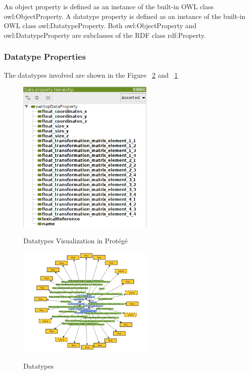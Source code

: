 An object property is defined as an instance of the built-in OWL class owl:ObjectProperty. A datatype property is defined as an instance of the built-in OWL class owl:DatatypeProperty. Both owl:ObjectProperty and owl:DatatypeProperty are subclasses of the RDF class rdf:Property.\\

\subsubsection*{Datatype Properties}
The datatypes involved are shown in the Figure ~\ref{fig:datatypes} and ~\ref{fig:datatypesProtege}

\begin{figure}[H]
\centering
\includegraphics[width=0.6\textwidth]{imgs/datatypeProtege.png}
\label{fig:datatypesProtege}
\caption{Datatypes Visualization in Prot\'eg\'e}
\end{figure}

\begin{figure}[H]
\centering
\includegraphics[width=0.6\textwidth]{imgs/Datatype.png}
\label{fig:datatypes}
\caption{Datatypes}
\end{figure}

